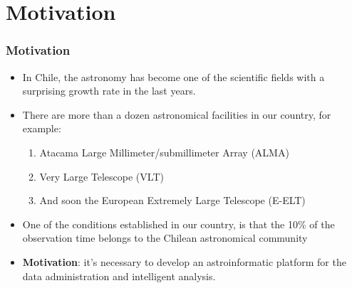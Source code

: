 \section{Motivation}

\begin{frame}
\frametitle{Motivation}

\begin{itemize}
	\item In Chile, the astronomy has become one of the scientific fields with a surprising growth rate in the last years.
	\item There are more than a dozen astronomical facilities in our country, for example:
		\begin{enumerate}
			\addtolength{\itemindent}{1cm}
			\item Atacama Large Millimeter/submillimeter Array (ALMA)
			\item Very Large Telescope (VLT)
			\item And soon the European Extremely Large Telescope (E-ELT)
		\end{enumerate}
	\item One of the conditions established in our country, is that the 10\% of the observation
		time belongs to the Chilean astronomical community
	\item \textbf{Motivation}: it's necessary to develop an astroinformatic platform for the data administration
		and intelligent analysis.
\end{itemize}

\end{frame}
